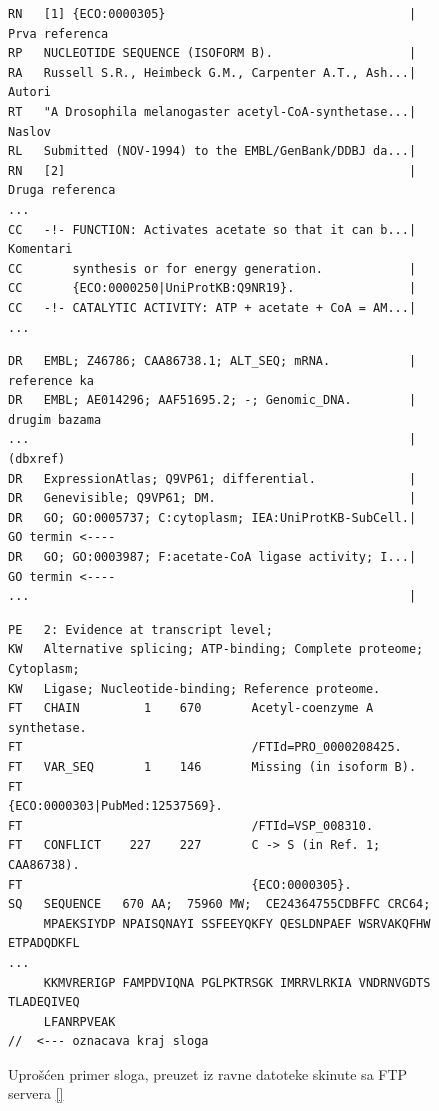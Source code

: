 \begin{figure}[h!]
\begin{lstlisting}[firstnumber=7,   basicstyle=\footnotesize\ttfamily\color{gray}]
RN   [1] {ECO:0000305}                                  | Prva referenca
RP   NUCLEOTIDE SEQUENCE (ISOFORM B).                   | 
RA   Russell S.R., Heimbeck G.M., Carpenter A.T., Ash...| Autori
RT   "A Drosophila melanogaster acetyl-CoA-synthetase...| Naslov
RL   Submitted (NOV-1994) to the EMBL/GenBank/DDBJ da...|
RN   [2]                                                | Druga referenca              
...                                                     
CC   -!- FUNCTION: Activates acetate so that it can b...| Komentari
CC       synthesis or for energy generation.            |
CC       {ECO:0000250|UniProtKB:Q9NR19}.                |
CC   -!- CATALYTIC ACTIVITY: ATP + acetate + CoA = AM...|
...                                                     
\end{lstlisting}
\begin{lstlisting}[firstnumber=30]
DR   EMBL; Z46786; CAA86738.1; ALT_SEQ; mRNA.           | reference ka
DR   EMBL; AE014296; AAF51695.2; -; Genomic_DNA.        | drugim bazama 
...                                                     | (dbxref)
DR   ExpressionAtlas; Q9VP61; differential.             |
DR   Genevisible; Q9VP61; DM.                           |
DR   GO; GO:0005737; C:cytoplasm; IEA:UniProtKB-SubCell.| GO termin <----
DR   GO; GO:0003987; F:acetate-CoA ligase activity; I...| GO termin <----
...                                                     |
\end{lstlisting}
\begin{lstlisting}[firstnumber=38]
PE   2: Evidence at transcript level;
KW   Alternative splicing; ATP-binding; Complete proteome; Cytoplasm; 
KW   Ligase; Nucleotide-binding; Reference proteome.                  
FT   CHAIN         1    670       Acetyl-coenzyme A synthetase.
FT                                /FTId=PRO_0000208425.
FT   VAR_SEQ       1    146       Missing (in isoform B).
FT                                {ECO:0000303|PubMed:12537569}.
FT                                /FTId=VSP_008310.
FT   CONFLICT    227    227       C -> S (in Ref. 1; CAA86738).
FT                                {ECO:0000305}.
SQ   SEQUENCE   670 AA;  75960 MW;  CE24364755CDBFFC CRC64;
     MPAEKSIYDP NPAISQNAYI SSFEEYQKFY QESLDNPAEF WSRVAKQFHW ETPADQDKFL
...
     KKMVRERIGP FAMPDVIQNA PGLPKTRSGK IMRRVLRKIA VNDRNVGDTS TLADEQIVEQ
     LFANRPVEAK
//  <--- oznacava kraj sloga
\end{lstlisting}
\caption{Uprošćen primer sloga, preuzet iz ravne datoteke  skinute sa FTP servera \ref{}  }
\label{fig:slog}
\end{figure}



